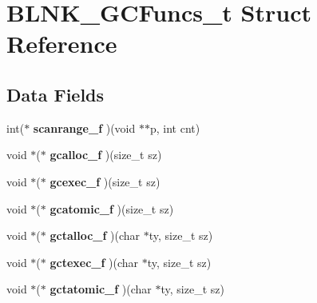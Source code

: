 \hypertarget{structBLNK__GCFuncs__t}{\section{B\-L\-N\-K\-\_\-\-G\-C\-Funcs\-\_\-t Struct Reference}
\label{structBLNK__GCFuncs__t}
}
\subsection*{Data Fields}
\begin{DoxyCompactItemize}
\item 
\hypertarget{structBLNK__GCFuncs__t_a78b2563f85822e6f53176d492aa0cd5c}{int($\ast$ {\bfseries scanrange\-\_\-f} )(void $\ast$$\ast$p, int cnt)}\label{structBLNK__GCFuncs__t_a78b2563f85822e6f53176d492aa0cd5c}

\item 
\hypertarget{structBLNK__GCFuncs__t_a40dfe5a7170d368bee3ec1f750585bb8}{void $\ast$($\ast$ {\bfseries gcalloc\-\_\-f} )(size\-\_\-t sz)}\label{structBLNK__GCFuncs__t_a40dfe5a7170d368bee3ec1f750585bb8}

\item 
\hypertarget{structBLNK__GCFuncs__t_a2b6985498757f5d8a1a060adfe93cf2c}{void $\ast$($\ast$ {\bfseries gcexec\-\_\-f} )(size\-\_\-t sz)}\label{structBLNK__GCFuncs__t_a2b6985498757f5d8a1a060adfe93cf2c}

\item 
\hypertarget{structBLNK__GCFuncs__t_a1a7c1e536cc47517fe5e34c0d051ea3d}{void $\ast$($\ast$ {\bfseries gcatomic\-\_\-f} )(size\-\_\-t sz)}\label{structBLNK__GCFuncs__t_a1a7c1e536cc47517fe5e34c0d051ea3d}

\item 
\hypertarget{structBLNK__GCFuncs__t_a711c59c247d8c0a26dfda89958aacb0b}{void $\ast$($\ast$ {\bfseries gctalloc\-\_\-f} )(char $\ast$ty, size\-\_\-t sz)}\label{structBLNK__GCFuncs__t_a711c59c247d8c0a26dfda89958aacb0b}

\item 
\hypertarget{structBLNK__GCFuncs__t_a06848e29f67e650184d762b9d729c0fd}{void $\ast$($\ast$ {\bfseries gctexec\-\_\-f} )(char $\ast$ty, size\-\_\-t sz)}\label{structBLNK__GCFuncs__t_a06848e29f67e650184d762b9d729c0fd}

\item 
\hypertarget{structBLNK__GCFuncs__t_a9ba94aa86a83afcc1b2ca4a0fcbd4234}{void $\ast$($\ast$ {\bfseries gctatomic\-\_\-f} )(char $\ast$ty, size\-\_\-t sz)}\label{structBLNK__GCFuncs__t_a9ba94aa86a83afcc1b2ca4a0fcbd4234}


\end{DoxyCompactItemize}
